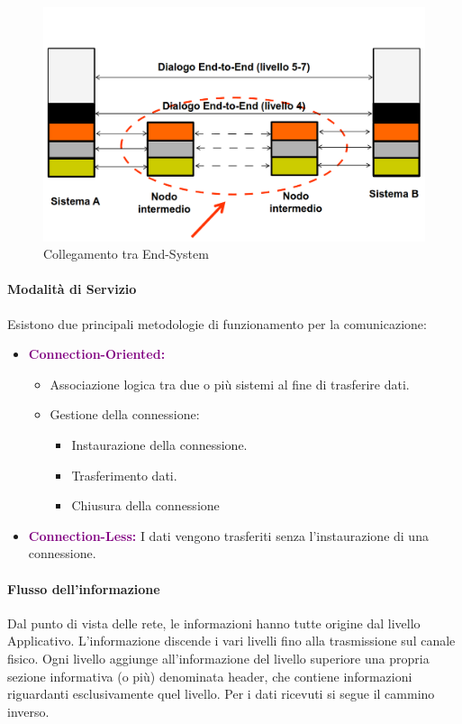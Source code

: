 \begin{figure}[h]
    \centering
    \includegraphics[scale=0.30]{Immagini/Collegamento-End-System.png}
    \caption{Collegamento tra End-System}
\end{figure}

\paragraph{Modalità di Servizio} Esistono due principali metodologie di funzionamento per la comunicazione:
\begin{itemize}
    \item \textbf{\textcolor{purple}{Connection-Oriented:}} 
        \begin{itemize}
            \item Associazione logica tra due o più sistemi al fine di trasferire dati.
            \item Gestione della connessione:
                \begin{itemize}
                    \item Instaurazione della connessione.
                    \item Trasferimento dati.
                    \item Chiusura della connessione
                \end{itemize}
        \end{itemize}
    \item \textbf{\textcolor{purple}{Connection-Less:}} I dati vengono trasferiti senza l'instaurazione di una connessione.
\end{itemize}

\paragraph{Flusso dell'informazione}
Dal punto di vista delle rete, le informazioni hanno tutte origine dal livello Applicativo. L'informazione discende i vari livelli fino alla trasmissione sul canale fisico.
Ogni livello aggiunge all’informazione del livello superiore una propria sezione informativa (o più) denominata header, che contiene informazioni riguardanti esclusivamente quel livello.
\newline Per i dati ricevuti si segue il cammino inverso.

